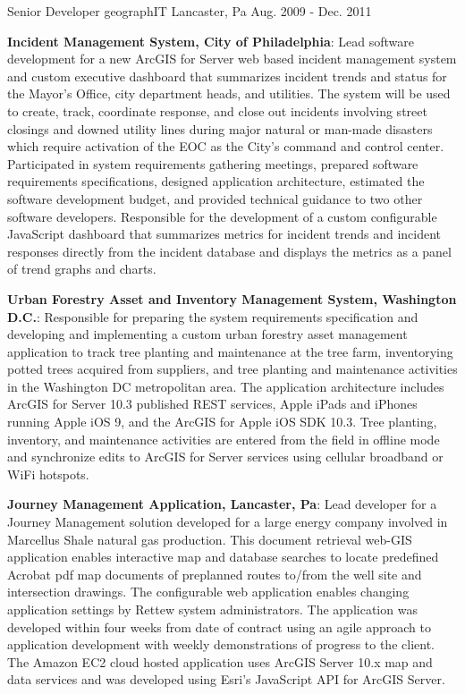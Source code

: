 \begin{cventries}
{\begin{cvitems}
      \end{cvitems}
    }
  \cventry
    {Senior Developer}
    {geographIT}
    {Lancaster, Pa}
    {Aug. 2009 - Dec. 2011}
    {
      \begin{cvitems}
        \item{\textbf{Incident Management System, City of Philadelphia}: Lead software development for a new ArcGIS for Server web based incident management system and custom executive dashboard that summarizes incident trends and status for the Mayor’s Office, city department heads, and utilities.  The system will be used to create, track, coordinate response, and close out incidents involving street closings and downed utility lines during major natural or man-made disasters which require activation of the EOC as the City’s command and control center.  Participated in system requirements gathering meetings, prepared software requirements specifications, designed application architecture, estimated the software development budget, and provided technical guidance to two other software developers.  Responsible for the development of a custom configurable JavaScript dashboard that summarizes metrics for incident trends and incident responses directly from the incident database and displays the metrics as a panel of trend graphs and charts.}
        \bigskip
        \item{\textbf{Urban Forestry Asset and Inventory Management System, Washington D.C.}: Responsible for preparing the system requirements specification and developing and implementing a custom urban forestry asset management application to track tree planting and maintenance at the tree farm, inventorying potted trees acquired from suppliers, and tree planting and maintenance activities in the Washington DC metropolitan area.  The application architecture includes ArcGIS for Server 10.3 published REST services, Apple iPads and iPhones running Apple iOS 9, and the ArcGIS for Apple iOS SDK 10.3.  Tree planting, inventory, and maintenance activities are entered from the field in offline mode and synchronize edits to ArcGIS for Server services using cellular broadband or WiFi hotspots.}
        \bigskip
        \item{\textbf{Journey Management Application, Lancaster, Pa}: Lead developer for a Journey Management solution developed for a large energy company involved in Marcellus Shale natural gas production.  This document retrieval web-GIS application enables interactive map and database searches to locate predefined Acrobat pdf map documents of preplanned routes to/from the well site and intersection drawings.  The configurable web application enables changing application settings by Rettew system administrators.  The application was developed within four weeks from date of contract using an agile approach to application development with weekly demonstrations of progress to the client.  The Amazon EC2 cloud hosted application uses ArcGIS Server 10.x map and data services and was developed using Esri’s JavaScript API for ArcGIS Server.}

\end{cvitems}}
\end{cventries}
